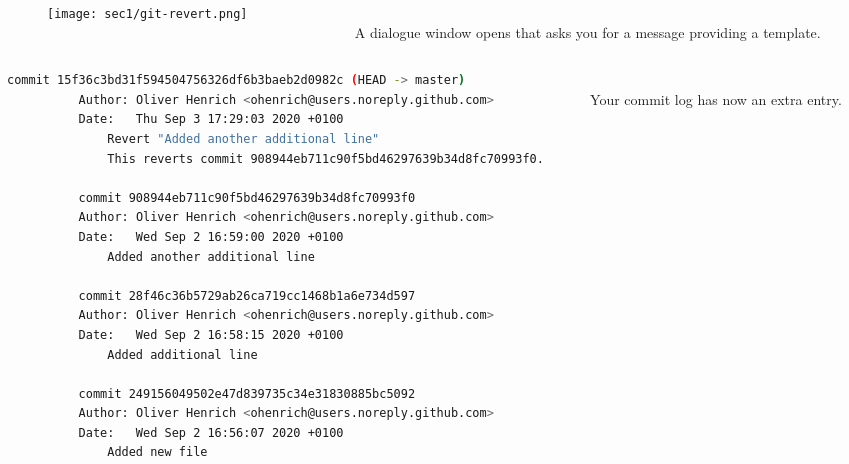 \begin{frame}[fragile]
\emptyframetitle

\vspace*{-0.75cm}
  \begin{columns}
    \begin{column}{0.55\textwidth}
      \begin{figure}[h]
        \texttt{[image: sec1/git-revert.png]}
      \end{figure}

    \end{column}

   \begin{column}{0.45\textwidth}
      \vspace*{0.5cm}\\
      A dialogue window opens that asks you for a message providing a template.
    \end{column}
  \end{columns}

\vspace*{-0.2cm}
  \begin{columns}
    \begin{column}{0.7\textwidth}

      \begin{block}{}
        \begin{lstlisting}[language=bash, basicstyle=\tiny\ttfamily]
          commit 15f36c3bd31f594504756326df6b3baeb2d0982c (HEAD -> master)
          Author: Oliver Henrich <ohenrich@users.noreply.github.com>
          Date:   Thu Sep 3 17:29:03 2020 +0100
              Revert "Added another additional line"
              This reverts commit 908944eb711c90f5bd46297639b34d8fc70993f0.

          commit 908944eb711c90f5bd46297639b34d8fc70993f0
          Author: Oliver Henrich <ohenrich@users.noreply.github.com>
          Date:   Wed Sep 2 16:59:00 2020 +0100
              Added another additional line

          commit 28f46c36b5729ab26ca719cc1468b1a6e734d597
          Author: Oliver Henrich <ohenrich@users.noreply.github.com>
          Date:   Wed Sep 2 16:58:15 2020 +0100
              Added additional line

          commit 249156049502e47d839735c34e31830885bc5092
          Author: Oliver Henrich <ohenrich@users.noreply.github.com>
          Date:   Wed Sep 2 16:56:07 2020 +0100
              Added new file
        \end{lstlisting}
      \end{block}
    \end{column}

     \begin{column}{0.25\textwidth}
        \vspace*{0.5cm}\\
        Your commit log has now an extra entry.
    \end{column}
  \end{columns}


\end{frame}

